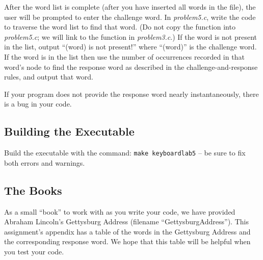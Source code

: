 After the word list is complete (after you have inserted all words in the
file), the user will be prompted to enter the challenge word. In
\textit{problem5.c}, write the code to traverse the word list to find that
word. (Do not copy the  function into \textit{problem5.c};
we will link to the function in \textit{problem3.c}.) If the word is not
present in the list, output ``(word) is not present!'' where ``(word)'' is the
challenge word. If the word is in the list then use the number of occurrences
recorded in that word's node to find the response word as described in the
challenge-and-response rules, and output that word.

If your program does not provide the response word nearly instantaneously,
there is a bug in your code.

\subsection*{Building the Executable}

Build the executable with the command: \texttt{make keyboardlab5} -- be sure to
fix both errors and warnings.

\subsection*{The Books}

As a small ``book'' to work with as you write your code, we have provided
Abraham Lincoln's Gettysburg Address (filename ``GettysburgAddress''). This
assignment's appendix has a table of the words in the Gettysburg Address and
the corresponding response word. We hope that this table will be helpful when
you test your code.

